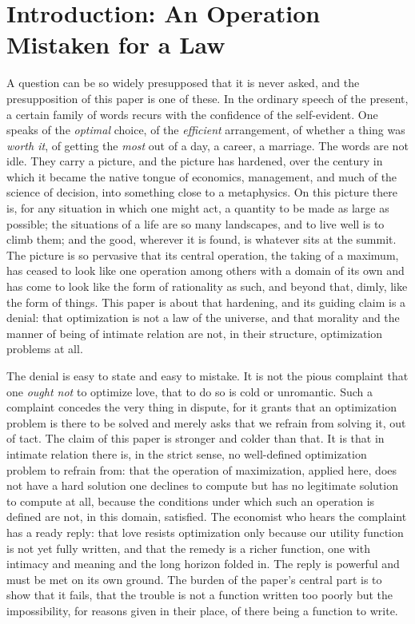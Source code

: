 \section{Introduction: An Operation Mistaken for a Law}
\label{p25:sec:intro}

\noindent
A question can be so widely presupposed that it is never asked, and the presupposition of this paper is one of these. In the ordinary speech of the present, a certain family of words recurs with the confidence of the self-evident. One speaks of the \emph{optimal} choice, of the \emph{efficient} arrangement, of whether a thing was \emph{worth it}, of getting the \emph{most} out of a day, a career, a marriage. The words are not idle. They carry a picture, and the picture has hardened, over the century in which it became the native tongue of economics, management, and much of the science of decision, into something close to a metaphysics. On this picture there is, for any situation in which one might act, a quantity to be made as large as possible; the situations of a life are so many landscapes, and to live well is to climb them; and the good, wherever it is found, is whatever sits at the summit. The picture is so pervasive that its central operation, the taking of a maximum, has ceased to look like one operation among others with a domain of its own and has come to look like the form of rationality as such, and beyond that, dimly, like the form of things. This paper is about that hardening, and its guiding claim is a denial: that optimization is not a law of the universe, and that morality and the manner of being of intimate relation are not, in their structure, optimization problems at all.

The denial is easy to state and easy to mistake. It is not the pious complaint that one \emph{ought not} to optimize love, that to do so is cold or unromantic. Such a complaint concedes the very thing in dispute, for it grants that an optimization problem is there to be solved and merely asks that we refrain from solving it, out of tact. The claim of this paper is stronger and colder than that. It is that in intimate relation there is, in the strict sense, no well-defined optimization problem to refrain from: that the operation of maximization, applied here, does not have a hard solution one declines to compute but has no legitimate solution to compute at all, because the conditions under which such an operation is defined are not, in this domain, satisfied. The economist who hears the complaint has a ready reply: that love resists optimization only because our utility function is not yet fully written, and that the remedy is a richer function, one with intimacy and meaning and the long horizon folded in. The reply is powerful and must be met on its own ground. The burden of the paper's central part is to show that it fails, that the trouble is not a function written too poorly but the impossibility, for reasons given in their place, of there being a function to write.

